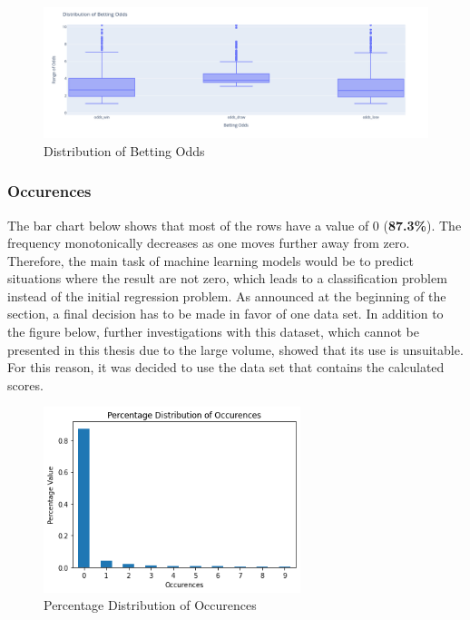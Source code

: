 \begin{figure}[H]
    \centering
    \label{fig:distribution_of_betting_odds}
    \includegraphics[width=16.5cm]{chapter/4_implementation/section/2_data/section/figures/distribution_of_betting_odds.png}
    \captionsetup{justification=centering}
    \caption{Distribution of Betting Odds}
\end{figure}

\subsubsection{Occurences}

The bar chart below shows that most of the rows have a value of 0 (\textbf{87.3\%}). The frequency monotonically decreases as one moves further away from zero. Therefore, the main task of machine learning models would be to predict situations where the result are not zero, which leads to a classification problem instead of the initial regression problem. As announced at the beginning of the section, a final decision has to be made in favor of one data set. In addition to the figure below, further investigations with this dataset, which cannot be presented in this thesis due to the large volume, showed that its use is unsuitable. For this reason, it was decided to use the data set that contains the calculated scores.

\begin{figure}[H]
    \centering
    \label{fig:percentage_distribution_of_occurrences}
    \includegraphics[width=7.5cm]{chapter/4_implementation/section/2_data/section/figures/percentage_distribution_of_occurences.png}
    \captionsetup{justification=centering}
    \caption{Percentage Distribution of Occurences}
\end{figure}

